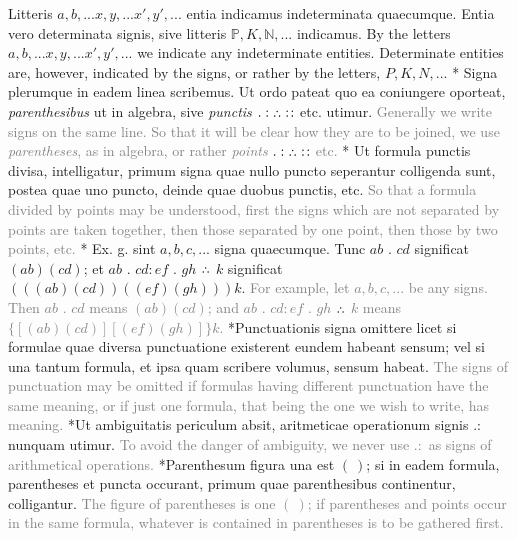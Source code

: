\documentclass{book}
\newcommand{\pppNoSpace}{\leavevmode\lower0ex\hbox{.}\kern-0.1em\raise0.7ex\hbox{.}\kern-0.1em\lower0ex\hbox{.}} %
\newcommand\irrelavent[1]{\textcolor{gray}{#1}}
\newenvironment{translateTwoCol}
               { %
                 \columnratio{0.5, 0.5} \begin{paracol}{2}
                 \newcommand{\LAT}{\switchcolumn[0]*}
                 \newcommand{\ENG}{\switchcolumn[1]}
               }
               { %
                 \let\ENG\undefined
                 \let\LAT\undefined
                 \end{paracol}
               }
\begin{document}
\begin{translateTwoCol}
Litteris $a,b,... x,y,... x', y',...$ entia indicamus indeterminata quaecumque. Entia vero determinata signis, sive litteris $\mathbb{P}, K, \mathbb{N},...$ indicamus.
\ENG
By the letters $a,b,... x,y,... x', y',...$ we indicate any indeterminate entities. Determinate entities are, however, indicated by the signs, or rather by the letters, $P, K, N,...$
\LAT
Signa plerumque in eadem linea scribemus. Ut ordo pateat quo ea coniungere oporteat, \emph{parenthesibus} ut in algebra, sive \emph{punctis} $. : \pppNoSpace :\hspace{0.1em}:$ etc. utimur.
\ENG
\irrelavent{Generally we write signs on the same line. So that it will be clear how they are to be joined, we use \emph{parentheses}, as in algebra, or rather \emph{points} $. : \pppNoSpace :\hspace{0.1em}:$ etc.}
\LAT
Ut formula punctis divisa, intelligatur, primum signa quae nullo puncto seperantur colligenda sunt, postea quae uno puncto, deinde quae duobus punctis, etc.
\ENG
\irrelavent{So that a formula divided by points may be understood, first the signs which are not separated by points are taken together, then those separated by one point, then those by two points, etc.}
\LAT
Ex. g. sint $a,b,c,...$ signa quaecumque. Tunc $ab$ $.$ $cd$ significat $(ab)(cd)$; et $ab$ $.$ $cd:ef$ $.$ $gh$ $\pppNoSpace$ $k$ significat $(((ab)(cd))((ef)(gh)))k$.
\ENG
\irrelavent{For example, let $a,b,c,...$ be any signs. Then $ab$ $.$ $cd$ means $(ab)(cd)$; and $ab$ $.$ $cd:ef$ $.$ $gh$ $\pppNoSpace$ $k$ means $\{[(ab)(cd)][(ef)(gh)]\}k$.}
\LAT Punctuationis signa omittere licet si formulae quae diversa punctuatione existerent eundem habeant sensum; vel si una tantum formula, et ipsa quam scribere volumus, sensum habeat.
\ENG \irrelavent{The signs of punctuation may be omitted if formulas having different punctuation have the same meaning, or if just one formula, that being the one we wish to write, has meaning.}
\LAT Ut ambiguitatis periculum absit, aritmeticae operationum signis $. :$ nunquam utimur.
\ENG \irrelavent{To avoid the danger of ambiguity, we never use $. :$ as signs of arithmetical operations.}
\LAT Parenthesum figura una est $( \ )$; si in eadem formula, parentheses et puncta occurant, primum quae parenthesibus continentur, colligantur.
\ENG \irrelavent{The figure of parentheses is one $( \ )$; if parentheses and points occur in the same formula, whatever is contained in parentheses is to be gathered first.}
\end{translateTwoCol}
\end{document}
